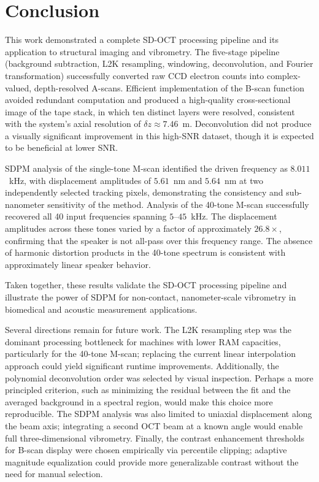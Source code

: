\documentclass[10pt]{article}
\begin{document}
\section{Conclusion}
This work demonstrated a complete SD-OCT processing pipeline and its application to structural imaging and vibrometry. The five-stage pipeline (background subtraction, L2K resampling, windowing, deconvolution, and Fourier transformation) successfully converted raw CCD electron counts into complex-valued, depth-resolved A-scans. Efficient implementation of the B-scan function avoided redundant computation and produced a high-quality cross-sectional image of the tape stack, in which ten distinct layers were resolved, consistent with the system's axial resolution of $\delta z \approx 7.46$~\textmu m. Deconvolution did not produce a visually significant improvement in this high-SNR dataset, though it is expected to be beneficial at lower SNR.

SDPM analysis of the single-tone M-scan identified the driven frequency as $8.011$~kHz, with displacement amplitudes of $5.61$~nm and $5.64$~nm at two independently selected tracking pixels, demonstrating the consistency and sub-nanometer sensitivity of the method. Analysis of the 40-tone M-scan successfully recovered all 40 input frequencies spanning $5$--$45$~kHz. The displacement amplitudes across these tones varied by a factor of approximately $26.8\times$, confirming that the speaker is not all-pass over this frequency range. The absence of harmonic distortion products in the 40-tone spectrum is consistent with approximately linear speaker behavior.

Taken together, these results validate the SD-OCT processing pipeline and illustrate the power of SDPM for non-contact, nanometer-scale vibrometry in biomedical and acoustic measurement applications.

Several directions remain for future work. The L2K resampling step was the dominant processing bottleneck for machines with lower RAM capacities, particularly for the 40-tone M-scan; replacing the current linear interpolation approach could yield significant runtime improvements. Additionally, the polynomial deconvolution order was selected by visual inspection. Perhaps a more principled criterion, such as minimizing the residual between the fit and the averaged background in a spectral region, would make this choice more reproducible. The SDPM analysis was also limited to uniaxial displacement along the beam axis; integrating a second OCT beam at a known angle would enable full three-dimensional vibrometry. Finally, the contrast enhancement thresholds for B-scan display were chosen empirically via percentile clipping; adaptive magnitude equalization could provide more generalizable contrast without the need for manual selection.
\end{document}
